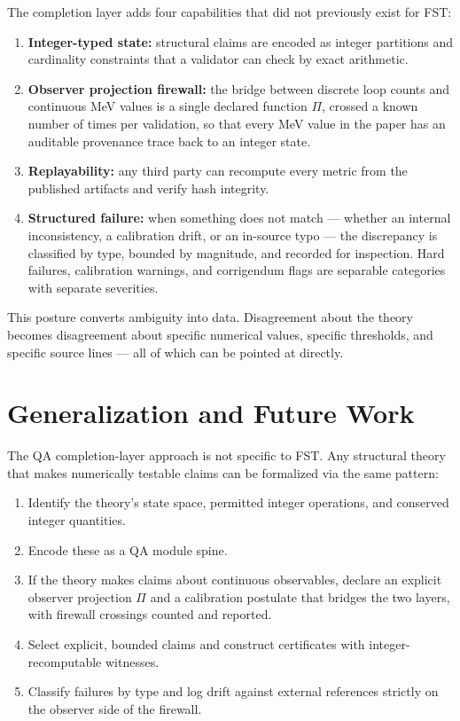 \documentclass[12pt,a4paper]{article}
\begin{document}
The completion layer adds four capabilities that did not previously
exist for FST:
\begin{enumerate}[nosep]
  \item \textbf{Integer-typed state:} structural claims are encoded as
        integer partitions and cardinality constraints that a
        validator can check by exact arithmetic.
  \item \textbf{Observer projection firewall:} the bridge between
        discrete loop counts and continuous MeV values is a single
        declared function $\Pi$, crossed a known number of times per
        validation, so that every MeV value in the paper has an
        auditable provenance trace back to an integer state.
  \item \textbf{Replayability:} any third party can recompute every
        metric from the published artifacts and verify hash integrity.
  \item \textbf{Structured failure:} when something does not match
        --- whether an internal inconsistency, a calibration drift,
        or an in-source typo --- the discrepancy is classified by type,
        bounded by magnitude, and recorded for inspection. Hard
        failures, calibration warnings, and corrigendum flags are
        separable categories with separate severities.
\end{enumerate}

This posture converts ambiguity into data. Disagreement about the
theory becomes disagreement about specific numerical values, specific
thresholds, and specific source lines --- all of which can be pointed
at directly.


\section{Generalization and Future Work}

The QA completion-layer approach is not specific to FST. Any
structural theory that makes numerically testable claims can be
formalized via the same pattern:
\begin{enumerate}[nosep]
  \item Identify the theory's state space, permitted integer
        operations, and conserved integer quantities.
  \item Encode these as a QA module spine.
  \item If the theory makes claims about continuous observables,
        declare an explicit observer projection $\Pi$ and a
        calibration postulate that bridges the two layers, with
        firewall crossings counted and reported.
  \item Select explicit, bounded claims and construct certificates
        with integer-recomputable witnesses.
  \item Classify failures by type and log drift against external
        references strictly on the observer side of the firewall.
\end{enumerate}
\end{document}
